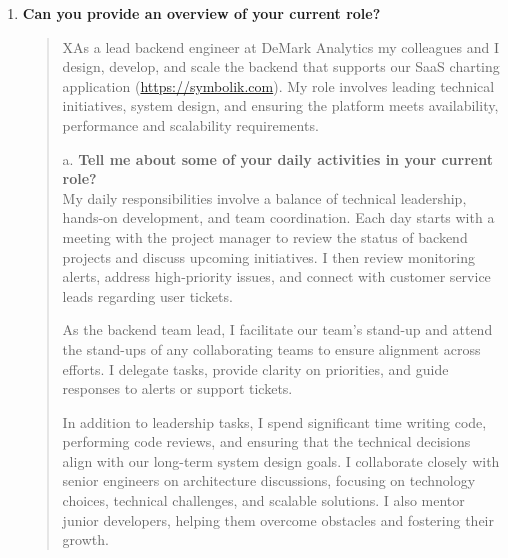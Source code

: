 

\begin{cvparagraph}


    \begin{enumerate}
      \item \textbf{Can you provide an overview of your current role?} \\
      \begin{quote}
          XAs a lead backend engineer at DeMark Analytics my colleagues and I design, develop, and scale the backend that supports our SaaS charting application (\url{https://symbolik.com}).
          My role involves leading technical initiatives, system design, and ensuring the platform meets availability, performance and scalability requirements.

          a. \textbf{Tell me about some of your daily activities in your current role?} \\
          My daily responsibilities involve a balance of technical leadership, hands-on development, and team coordination.
          Each day starts with a meeting with the project manager to review the status of backend projects and discuss upcoming initiatives.
          I then review monitoring alerts, address high-priority issues, and connect with customer service leads regarding user tickets.

          As the backend team lead, I facilitate our team’s stand-up and attend the stand-ups of any collaborating teams to ensure alignment across efforts.
          I delegate tasks, provide clarity on priorities, and guide responses to alerts or support tickets.

          In addition to leadership tasks, I spend significant time writing code, performing code reviews, and ensuring that the technical decisions align with our long-term system design goals.
          I collaborate closely with senior engineers on architecture discussions, focusing on technology choices, technical challenges, and scalable solutions.
          I also mentor junior developers, helping them overcome obstacles and fostering their growth.


\end{quote}
\end{enumerate}
\end{cvparagraph}
